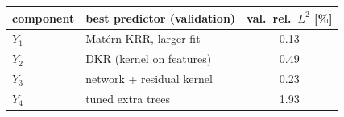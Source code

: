 \begin{tabular}{llc}
\toprule
component & best predictor (validation) & val.\ rel.\ $L^2$ [\%] \\
\midrule
$Y_1$ & Mat\'ern KRR, larger fit & 0.13 \\
$Y_2$ & DKR (kernel on features) & 0.49 \\
$Y_3$ & network + residual kernel & 0.23 \\
$Y_4$ & tuned extra trees & 1.93 \\
\bottomrule
\end{tabular}
